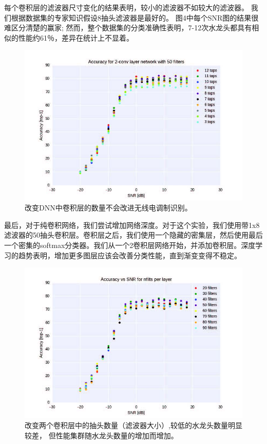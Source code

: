 每个卷积层的滤波器尺寸变化的结果表明，较小的滤波器不如较大的滤波器。 我们根据数据集的专家知识假设8抽头滤波器是最好的。 图4中每个SNR图的结果很难区分清楚的赢家; 然而，整个数据集的分类准确性表明，7-12次水龙头都具有相似的性能约61％，差异在统计上不显着。\par

\begin{figure}[!h]
	\centering
	\includegraphics[scale=1]{figures/chapter_5/fig2}
	\caption{改变DNN中卷积层的数量不会改进无线电调制识别。}\label{fig_5_2}
\end{figure}

最后，对于纯卷积网络，我们尝试增加网络深度。对于这个实验，我们使用带1x8滤波器的50抽头卷积层。卷积层之后，我们使用一个隐藏的密集层，然后使用最后一个密集的softmax分类器。我们从一个2卷积层网络开始，并添加卷积层。深度学习的趋势表明，增加更多图层应该会改善分类性能，直到渐变变得不稳定。\par


\begin{figure}[!h]
	\centering
	\includegraphics[scale=1]{figures/chapter_5/fig1}
	\caption{改变两个卷积层中的抽头数量（滤波器大小）,较低的水龙头数量明显较差，
		但性能集群随水龙头数量的增加而增加。}\label{fig_5_1}
\end{figure}

